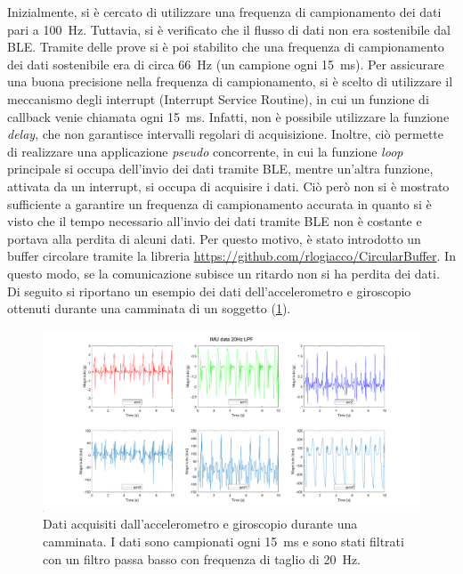 Inizialmente, si è cercato di utilizzare una frequenza di campionamento dei dati pari a \SI{100}{\hertz}. Tuttavia, si è verificato che il flusso di dati non era sostenibile dal BLE. Tramite delle prove si è poi stabilito che una frequenza di campionamento dei dati sostenibile era di circa \SI{66}{\hertz} (un campione ogni \SI{15}{\milli\second}). Per assicurare una buona precisione nella frequenza di campionamento, si è scelto di utilizzare il meccanismo degli interrupt (Interrupt Service Routine), in cui un funzione di callback venie chiamata ogni \SI{15}{\milli\second}. Infatti, non è possibile utilizzare la funzione \textit{delay}, che non garantisce intervalli regolari di acquisizione. Inoltre, ciò permette di realizzare una applicazione \textit{pseudo} concorrente, in cui la funzione \textit{loop} principale si occupa dell'invio dei dati tramite BLE, mentre un'altra funzione, attivata da un interrupt, si occupa di acquisire i dati. Ciò però non si è mostrato sufficiente a garantire un frequenza di campionamento accurata in quanto si è visto che il tempo necessario all'invio dei dati tramite BLE non è costante e portava alla perdita di alcuni dati.
Per questo motivo, è stato introdotto un buffer circolare tramite la libreria \url{https://github.com/rlogiacco/CircularBuffer}. In questo modo, se la comunicazione subisce un ritardo non si ha perdita dei dati. Di seguito si riportano un esempio dei dati dell'accelerometro e giroscopio ottenuti durante una camminata di un soggetto (\Fig\ref{fig:imu_data}).
\begin{figure}[tbh]
	\centering
	\includegraphics[width=1\linewidth]{./ImageFiles/IMU_data_example.pdf}
	\caption{Dati acquisiti dall'accelerometro e giroscopio durante una camminata. I dati sono campionati ogni \SI{15}{\milli\second} e sono stati filtrati con un filtro passa basso con frequenza di taglio di \SI{20}{\hertz}.}
	\label{fig:imu_data}
\end{figure}
